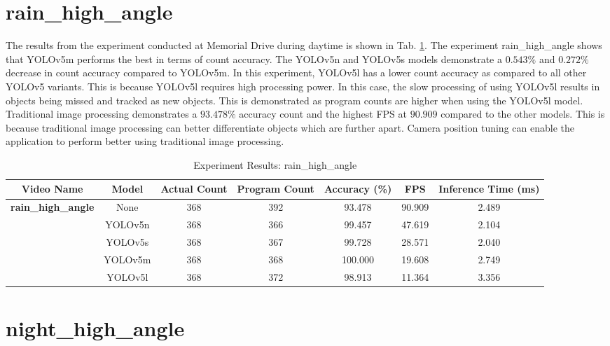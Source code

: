 \documentclass[12pt,a4paper,fleqn]{report}
\begin{document}
\section{rain\_high\_angle}

The results from the experiment conducted at Memorial Drive during daytime is shown in Tab.
\ref{tab:result_rha}.
The experiment rain\_high\_angle shows that YOLOv5m performs the best in terms of count accuracy.
The YOLOv5n and YOLOv5s models demonstrate a $0.543\%$ and $0.272\%$ decrease in count accuracy compared to
YOLOv5m.
In this experiment, YOLOv5l has a lower count accuracy as compared to all other YOLOv5 variants.
This is because YOLOv5l requires high processing power.
In this case, the slow processing of using YOLOv5l results in objects being missed and tracked as
new objects.
This is demonstrated as program counts are higher when using the YOLOv5l model.
Traditional image processing demonstrates a $93.478\%$ accuracy count and the highest FPS at
$90.909$ compared to the other models.
This is because traditional image processing can better differentiate objects which are further
apart.
Camera position tuning can enable the application to perform better using traditional image
processing.

\begin{table}[htbp]
    \begin{adjustbox}{width=1\textwidth}
    \begin{tabular}{|c|c|c|c|c|c|c|}
    \hline
    \textbf{Video Name} & \textbf{Model} & \textbf{Actual Count} & \textbf{Program Count} & \textbf{Accuracy (\%)} & \textbf{FPS} & \textbf{Inference Time (ms)} \\ \hline
    \multirow{5}{*}{\textbf{rain\_high\_angle}} & None & 368 & 392 & 93.478 & 90.909 & 2.489 \\ \cline{2-7}
     & YOLOv5n & 368 & 366 & 99.457 & 47.619 & 2.104 \\ \cline{2-7}
     & YOLOv5s & 368 & 367 & 99.728 & 28.571 & 2.040 \\ \cline{2-7}
     & YOLOv5m & 368 & 368 & 100.000 & 19.608 & 2.749 \\ \cline{2-7}
     & YOLOv5l & 368 & 372 & 98.913 & 11.364 & 3.356 \\ \hline
    \end{tabular}
    \end{adjustbox}
    \caption{Experiment Results: rain\_high\_angle}
    \label{tab:result_rha}
\end{table}

\section{night\_high\_angle}
\end{document}
